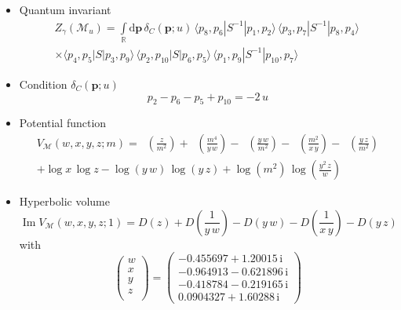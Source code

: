 \documentclass[12pt,reqno]{amsart}
\numberwithin{equation}{section}
\renewcommand{\Im}{\operatorname{Im}}
\DeclareMathOperator{\Li}{Li_2}
\newcommand{\I}{\mathrm{i}}
\begin{document}
\begin{itemize}
\item  Quantum invariant
\begin{multline*}
  Z_\gamma\left( \mathcal{M}_u \right)
  = \int\limits_\mathbb{R} 
  \mathrm{d} \boldsymbol{p} \,
  \delta_C(\boldsymbol{p}; u) \,
    \langle p_8 , p_6 | S^{-1} | p_1 , p_2 \rangle \, 
    \langle p_3 , p_7 | S^{-1} | p_8 , p_4 \rangle \,
    \\
    \times
    \langle p_4 , p_5 | S | p_3 , p_9 \rangle \, 
    \langle p_2 , p_{10} | S | p_6 , p_5 \rangle \, 
    \langle p_1 , p_9 | S^{-1} | p_{10} , p_7 \rangle 
  \end{multline*}

\item
Condition $\delta_C(\boldsymbol{p};u)$
  \begin{equation*}
    p_2 - p_6 - p_5+ p_{10}
    = -  2 \, u
  \end{equation*}


\item Potential function
  \begin{multline*}
    V_{\mathcal{M}}(w,x,y,z; m)
    =
    \Li\left(\frac{z}{m^2}\right)
    + \Li\left(\frac{m^4}{y \, w}\right)
    - \Li\left(\frac{y \, w}{m^2}\right)
    - \Li\left(\frac{m^2}{x \, y}\right)
    - \Li\left(\frac{y \, z}{m^2}\right)
    \\
    + \log x \, \log z
    - \log( y \, w) \, \log(y \, z)
    + \log \left( m^2 \right) \, \log\left(\frac{y^2 \, z}{w}\right)
  \end{multline*}


\item Hyperbolic volume
  \begin{equation*}
    \Im V_{\mathcal{M}}(w,x,y,z; 1)
    =
    D\left({z}\right)
    + D\left(\frac{1}{y \, w}\right)
    - D\left(y \, w\right)
    - D\left(\frac{1}{x \, y}\right)
    - D\left(y \, z\right)
  \end{equation*}
  with
  \begin{equation*}
    \begin{pmatrix}
      w \\ x\\ y \\ z\\
    \end{pmatrix}
    =
    \begin{pmatrix}
      -0.455697 + 1.20015  \, \I
      \\
      -0.964913 - 0.621896 \, \I
      \\
      -0.418784 - 0.219165 \, \I
      \\
      0.0904327 + 1.60288 \, \I
    \end{pmatrix}
  \end{equation*}


\end{itemize}
\end{document}
